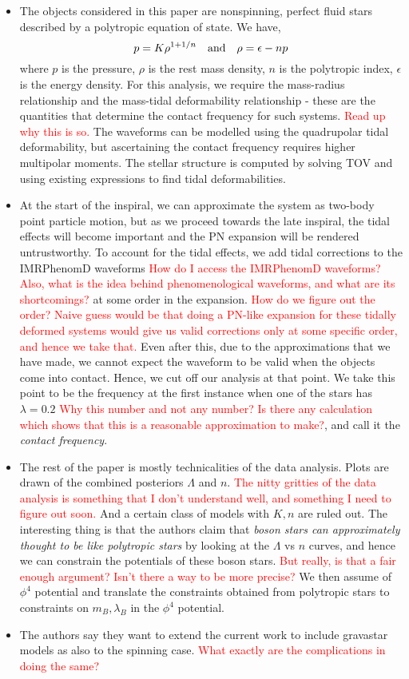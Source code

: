 \documentclass[a4paper,11pt]{article}
\begin{document}
\begin{itemize}
	\item The objects considered in this paper are nonspinning, perfect fluid stars described by a polytropic equation of state. We have,
	\begin{equation*}
	p = K \rho^{1 + 1/n} \qq{and} \rho = \epsilon - n p
	\end{equation*}
	where $ p $ is the pressure, $ \rho $ is the rest mass density, $ n $ is the polytropic index, $ \epsilon $ is the energy density. For this analysis, we require the mass-radius relationship and the mass-tidal deformability relationship - these are the quantities that determine the contact frequency for such systems. \textcolor{red}{Read up why this is so.} The waveforms can be modelled using the quadrupolar tidal deformability, but ascertaining the contact frequency requires higher multipolar moments. The stellar structure is computed by solving TOV and using existing expressions to find tidal deformabilities.
	
	\item At the start of the inspiral, we can approximate the system as two-body point particle motion, but as we proceed towards the late inspiral, the tidal effects will become important and the PN expansion will be rendered untrustworthy. To account for the tidal effects, we add tidal corrections to the IMRPhenomD waveforms \textcolor{red}{How do I access the IMRPhenomD waveforms? Also, what is the idea behind phenomenological waveforms, and what are its shortcomings?} at some order in the expansion. \textcolor{red}{How do we figure out the order? Naive guess would be that doing a PN-like expansion for these tidally deformed systems would give us valid corrections only at some specific order, and hence we take that.} Even after this, due to the approximations that we have made, we cannot expect the waveform to be valid when the objects come into contact. Hence, we cut off our analysis at that point. We take this point to be the frequency at the first instance when one of the stars has $ \lambda = 0.2 $ \textcolor{red}{Why this number and not any number? Is there any calculation which shows that this is a reasonable approximation to make?}, and call it the \textit{contact frequency}.
	
	\item The rest of the paper is mostly technicalities of the data analysis. Plots are drawn of the combined posteriors $ \Lambda $ and $ n $. \textcolor{red}{The nitty gritties of the data analysis is something that I don't understand well, and something I need to figure out soon.} And a certain class of models with $ K, n $ are ruled out. The interesting thing is that the authors claim that \textit{boson stars can approximately thought to be like polytropic stars} by looking at the $ \Lambda $ vs $ n $ curves, and hence we can constrain the potentials of these boson stars. \textcolor{red}{But really, is that a fair enough argument? Isn't there a way to be more precise?} We then assume of $ \phi^4 $ potential and translate the constraints obtained from polytropic stars to constraints on $ m_B, \lambda_B $ in the $ \phi^4 $ potential. 
	
	\item The authors say they want to extend the current work to include gravastar models as also to the spinning case. \textcolor{red}{What exactly are the complications in doing the same?}
\end{itemize}
\end{document}
